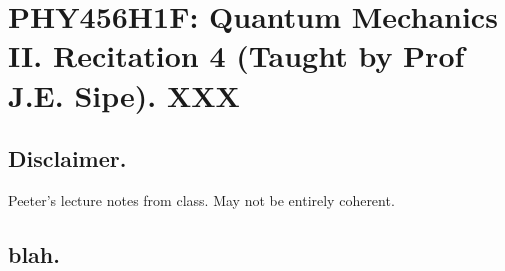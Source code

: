 
%

\chapter{PHY456H1F: Quantum Mechanics II.  Recitation 4 (Taught by Prof J.E. Sipe).  XXX}
\label{chap:qmTwoR4}
{}
\date{Nov XX, 2011}

\beginArtWithToc

\section{Disclaimer.}

Peeter's lecture notes from class.  May not be entirely coherent.

\section{blah.}

\cite{desai2009quantum}

\EndArticle
